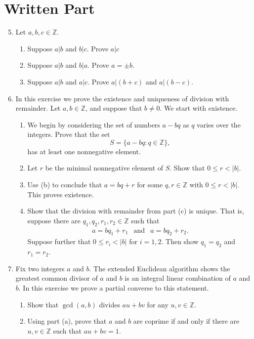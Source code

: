 \documentclass[11pt]{article}
\newcommand{\bZ}{\mathbb{Z}}
\begin{document}
\section*{Written Part}
\begin{enumerate}
  \setcounter{enumi}{4}
  \item{
  Let $a,b,c\in\bZ$.
  \begin{enumerate}
    \item{
    Suppose $a|b$ and $b|c$.  Prove $a|c$
    }
    \item{
    Suppose $a|b$ and $b|a$.  Prove $a=\pm b$.
    }
    \item{
    Suppose $a|b$ and $a|c$.  Prove $a|(b+c)$ and $a|(b-c)$.
    }
  \end{enumerate}
  }
  \item{
  In this exercise we prove the existence and uniqueness of division with remainder.  Let $a,b\in\bZ$, and suppose that $b\not=0$.  We start with existence.
  \begin{enumerate}
    \item{
    We begin by considering the set of numbers $a-bq$ as $q$ varies over the integers.  Prove that the set
    \[S = \{a-bq : q\in\bZ\},\]
    has at least one nonnegative element.
    }
    \item{
    Let $r$ be the minimal nonnegative element of $S$.  Show that $0\le r< |b|$.
    }
    \item{
    Use (b) to conclude that $a = bq+r$ for some $q,r\in\bZ$ with $0\le r<|b|$.  This proves existence.
    }
    \item{
    Show that the division with remainder from part (c) is unique.  That is, suppose there are $q_1,q_2,r_1,r_2\in\bZ$ such that
    \begin{eqnarray*}
      a = bq_1+r_1 &\text{and}&a= bq_2+r_2.
    \end{eqnarray*}
    Suppose further that $0\le r_i< |b|$ for $i=1,2$.  Then show $q_1=q_2$ and $r_1=r_2$.
    }
  \end{enumerate}
  }
  \item{
  Fix two integers $a$ and $b$.  The extended Euclidean algorithm shows the greatest common divisor of $a$ and $b$ is an integral linear combination of $a$ and $b$.  In this exercise we prove a partial converse to this statement.
  \begin{enumerate}
    \item{
    Show that $\gcd(a,b)$ divides $au+bv$ for any $u,v\in\bZ$.
    }
    \item{
    Using part (a), prove that $a$ and $b$ are coprime if and only if there are $u,v\in\bZ$ such that $au+bv=1$.
}
\end{enumerate}}
\end{enumerate}
\end{document}
